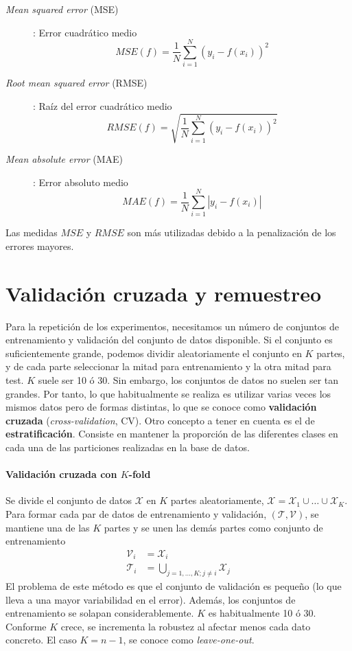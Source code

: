 \begin{description}
	\item[\textit{Mean squared error} (MSE)]: Error 
	cuadrático medio
		\[ MSE(f) = \frac{1}{N} \sum\limits_{i=1}^N
								(y_i - f(x_i))^2	\]
	\item[\textit{Root mean squared error} (RMSE)]: Raíz del 
	error cuadrático medio
		\[ RMSE(f) = \sqrt{\frac{1}{N} 
		\sum\limits_{i=1}^N (y_i - f(x_i))^2}	\]
		
	\item[\textit{Mean absolute error} (MAE)]: Error 
	absoluto medio
		\[ MAE(f) = \frac{1}{N} \sum\limits_{i=1}^N
								|y_i - f(x_i)|	\]
\end{description}

	Las medidas $MSE$ y $RMSE$ son más utilizadas debido a la 
penalización de los errores mayores. 

\section{Validación cruzada y remuestreo}
\label{sec:CV}
	
	Para la repetición de los experimentos, necesitamos un 
número de conjuntos de entrenamiento y validación del 
conjunto de datos disponible. Si el conjunto es 
suficientemente grande, podemos dividir aleatoriamente el 
conjunto en $K$ partes, y de cada parte seleccionar la mitad 
para entrenamiento y la otra mitad para test. $K$ suele ser 
10 ó 30. Sin embargo, los conjuntos de datos no suelen ser 
tan grandes. Por tanto, lo que habitualmente se realiza es 
utilizar varias veces los mismos datos pero de formas 
distintas, lo que se conoce como \textbf{validación cruzada} 
(\textit{cross-validation}, CV). Otro concepto a tener en 
cuenta es el de \textbf{estratificación}. Consiste en 
mantener la proporción de las diferentes clases en cada una 
de las particiones realizadas en la base de datos. 
	
\paragraph{Validación cruzada con $K$-fold} Se divide el 
conjunto de datos $\mathcal{X}$ en $K$ partes aleatoriamente, 
$\mathcal{X} = \mathcal{X}_1 \cup \dots \cup \mathcal{X}_K$. 
Para formar cada par de datos de entrenamiento y validación, 
$(\mathcal{T}, \mathcal{V})$, se mantiene una de las $K$ 
partes y se unen las demás partes como conjunto de 
entrenamiento
\begin{align*}
	\mathcal{V}_i &= \mathcal{X}_i \\
	\mathcal{T}_i &= \underset{j=1,\dots,K; j\neq i}
							\bigcup \mathcal{X}_j
\end{align*} 
	El problema de este método es que el conjunto de 
validación es pequeño (lo que lleva a una mayor variabilidad 
en el error). Además, los conjuntos de entrenamiento se 
solapan considerablemente. $K$ es habitualmente 10 ó 30. 
Conforme $K$ crece, se incrementa la robustez al afectar 
menos cada dato concreto. El caso $K = n-1$, se conoce como 
\textit{leave-one-out}. 

